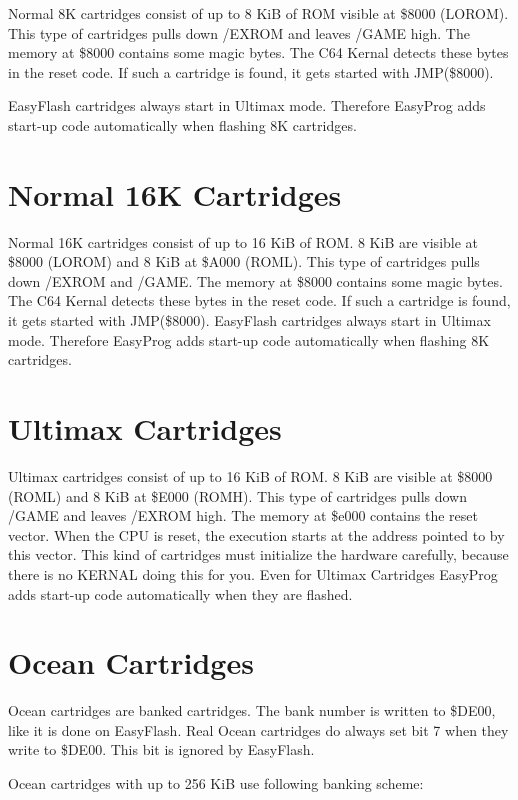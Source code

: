 \documentclass[a4paper,oneside]{memoir}
\begin{document}
Normal 8K cartridges consist of up to 8 KiB of ROM visible at \$8000 (LOROM).
This type of cartridges pulls down /EXROM and leaves /GAME high.
The memory at \$8000 contains some magic bytes. The C64 Kernal detects these
bytes in the reset code. If such a cartridge is found, it gets started with
JMP(\$8000).

EasyFlash cartridges always start in Ultimax mode. Therefore EasyProg adds
start-up code automatically when flashing 8K cartridges.

\section{Normal 16K Cartridges}

Normal 16K cartridges consist of up to 16 KiB of ROM. 8 KiB are visible at
\$8000 (LOROM) and 8 KiB at \$A000 (ROML). This type of cartridges pulls down
/EXROM and /GAME.
The memory at \$8000 contains some magic bytes. The C64 Kernal detects these
bytes in the reset code. If such a cartridge is found, it gets started with
JMP(\$8000).
EasyFlash cartridges always start in Ultimax mode. Therefore EasyProg adds
start-up code automatically when flashing 8K cartridges.

\section{Ultimax Cartridges}

Ultimax cartridges consist of up to 16 KiB of ROM. 8 KiB are visible at \$8000
(ROML) and 8 KiB at \$E000 (ROMH). This type of cartridges pulls down /GAME and
leaves /EXROM high.
The memory at \$e000 contains the reset vector. When the CPU is reset, the
execution starts at the address pointed to by this vector. This kind of
cartridges must initialize the hardware carefully, because there is no KERNAL
doing this for you.
Even for Ultimax Cartridges EasyProg adds start-up code automatically when they
are flashed.

\section{Ocean Cartridges}

Ocean cartridges are banked cartridges. The bank number is written to \$DE00,
like it is done on EasyFlash.
Real Ocean cartridges do always set bit 7 when they write to \$DE00. This bit
is ignored by EasyFlash.

Ocean cartridges with up to 256 KiB use following banking scheme:
\end{document}
